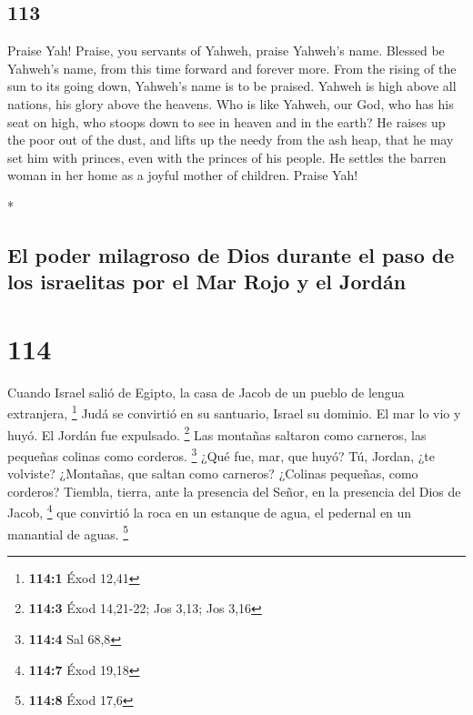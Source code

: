\begin{paracol}{2}
\switchcolumn
\begin{otherlanguage}{english}

\hypertarget{section-225}{%
\section{113}\label{section-225}}

 Praise Yah! Praise, you servants of Yahweh, praise
Yahweh's name.  Blessed be Yahweh's name, from this time
forward and forever more.  From the rising of the sun to
its going down, Yahweh's name is to be praised.  Yahweh is
high above all nations, his glory above the heavens.  Who
is like Yahweh, our God, who has his seat on high,  who
stoops down to see in heaven and in the earth?  He raises
up the poor out of the dust, and lifts up the needy from the ash heap,
 that he may set him with princes, even with the princes
of his people.  He settles the barren woman in her home as
a joyful mother of children. Praise Yah!

\end{otherlanguage}

\switchcolumn[0]*

\hypertarget{el-poder-milagroso-de-dios-durante-el-paso-de-los-israelitas-por-el-mar-rojo-y-el-jorduxe1n}{%
\subsection{El poder milagroso de Dios durante el paso de los israelitas
por el Mar Rojo y el
Jordán}\label{el-poder-milagroso-de-dios-durante-el-paso-de-los-israelitas-por-el-mar-rojo-y-el-jorduxe1n}}

\hypertarget{section-226}{%
\section{114}\label{section-226}}

 Cuando Israel salió de Egipto, la casa de Jacob de un
pueblo de lengua extranjera, \footnote{\textbf{114:1} Éxod 12,41}
 Judá se convirtió en su santuario, Israel su dominio.
 El mar lo vio y huyó. El Jordán fue expulsado.
\footnote{\textbf{114:3} Éxod 14,21-22; Jos 3,13; Jos 3,16}
 Las montañas saltaron como carneros, las pequeñas colinas
como corderos. \footnote{\textbf{114:4} Sal 68,8}  ¿Qué
fue, mar, que huyó? Tú, Jordan, ¿te volviste?  ¿Montañas,
que saltan como carneros? ¿Colinas pequeñas, como corderos?
 Tiembla, tierra, ante la presencia del Señor, en la
presencia del Dios de Jacob, \footnote{\textbf{114:7} Éxod 19,18}
 que convirtió la roca en un estanque de agua, el pedernal
en un manantial de aguas. \footnote{\textbf{114:8} Éxod 17,6}


\end{paracol}
